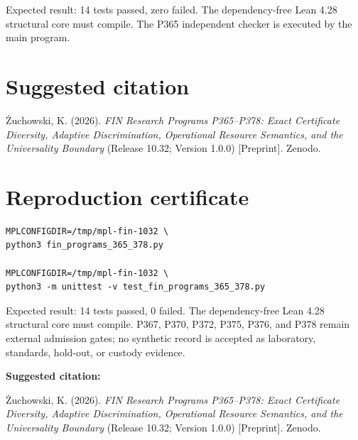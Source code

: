 \documentclass[11pt,a4paper,openany]{report}
\begin{document}
Expected result: 14 tests passed, zero failed. The dependency-free Lean 4.28 structural core must compile. The P365 independent checker is executed by the main program.

\chapter{Suggested citation}

\.Zuchowski, K. (2026). \emph{FIN Research Programs P365--P378: Exact Certificate Diversity, Adaptive Discrimination, Operational Resource Semantics, and the Universality Boundary} (Release 10.32; Version 1.0.0) [Preprint]. Zenodo.


\clearpage
\chapter*{Reproduction certificate}
\begin{Verbatim}[fontsize=\small]
MPLCONFIGDIR=/tmp/mpl-fin-1032 \
python3 fin_programs_365_378.py

MPLCONFIGDIR=/tmp/mpl-fin-1032 \
python3 -m unittest -v test_fin_programs_365_378.py
\end{Verbatim}
Expected result: 14 tests passed, 0 failed. The dependency-free Lean 4.28
structural core must compile. P367, P370, P372, P375, P376, and P378 remain
external admission gates; no synthetic record is accepted as laboratory,
standards, hold-out, or custody evidence.

\medskip
\noindent\textbf{Suggested citation:}

\.Zuchowski, K. (2026). \emph{FIN Research Programs P365--P378:
Exact Certificate Diversity, Adaptive Discrimination, Operational Resource
Semantics, and the Universality Boundary} (Release 10.32; Version 1.0.0)
[Preprint]. Zenodo.
\end{document}

